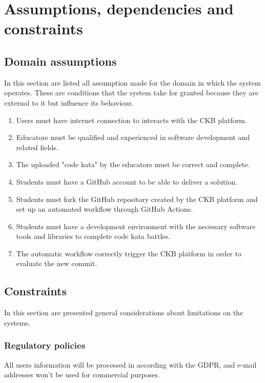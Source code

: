 \section{Assumptions, dependencies and constraints}

\subsection{Domain assumptions}
In this section are listed all assumption made for the domain in which the system operates. These are conditions that the system take for granted because they are external to it but influence its behaviour.
\begin{enumerate}[label=\textbf{DA.\arabic*}]
        \item {} {Users must have internet connection to interacts with the CKB platform.}
        \item {} {Educators must be qualified and experienced in software development and related fields.}
        \item {} {The uploaded "code kata" by the educators must be correct and complete.}
        \item {} {Students must have a GitHub account to be able to deliver a solution.}
        \item {} {Students must fork the GitHub repository created by the CKB platform and set up an automated workflow through GitHub Actions.}
        \item {} {Students must have a development environment with the necessary software tools and libraries to complete code kata battles.}
        \item {} {The automatic workflow correctly trigger the CKB platform in order to evaluate the new commit.}
        
        
\end{enumerate}

\subsection{Constraints}
In this section are presented general considerations about limitations on the systems.

\subsubsection*{Regulatory policies}
All users information will be processed in according with the GDPR, and e-mail addresses won't be used for commercial purposes.
